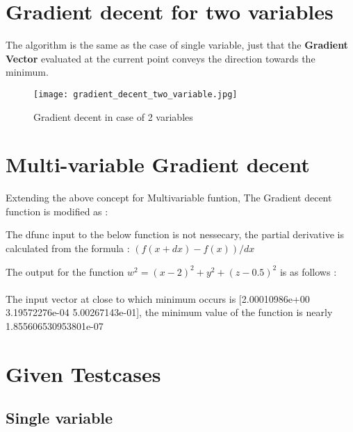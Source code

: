 \documentclass[titlepage, 11pt]{article}
\begin{document}
\section{Gradient decent for two variables}
\begin{flushleft}
    The algorithm is the same as the case of single variable, just that the \textbf{Gradient Vector} evaluated at the current point conveys the direction towards the minimum.
\end{flushleft}

\begin{figure}[ht]
    \centering
    \texttt{[image: gradient\_decent\_two\_variable.jpg]}
    \caption{Gradient decent in case of 2 variables}
    \label{fig:gradient_decent_singel_variable-png}
\end{figure}
\section{Multi-variable Gradient decent}
\begin{flushleft}
    Extending the above concept for Multivariable funtion, The Gradient decent function is modified as :
\end{flushleft}
\begin{note}[Note]
    The dfunc input to the below function is not nessecary, the partial derivative is calculated from the formula : $(f(x + dx) - f(x))/ dx$
\end{note}

\begin{example}
    The output for the function $w^2 = (x-2)^2 + y^2 + (z-0.5)^2$ is as follows : 
    \\
    \\
    The input vector at close to which minimum occurs is [2.00010986e+00 \: 3.19572276e-04 \: 5.00267143e-01], the minimum value of the function is nearly 
    1.855606530953801e-07
\end{example}
\section{Given Testcases}
\subsection{Single variable}
\end{document}
